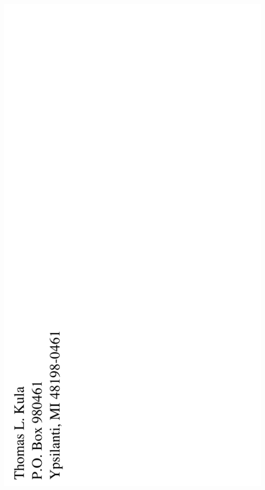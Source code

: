 \documentclass[12pt]{article}
\begin{document}
\includegraphics{../includes/backpage.png}
\end{document}
